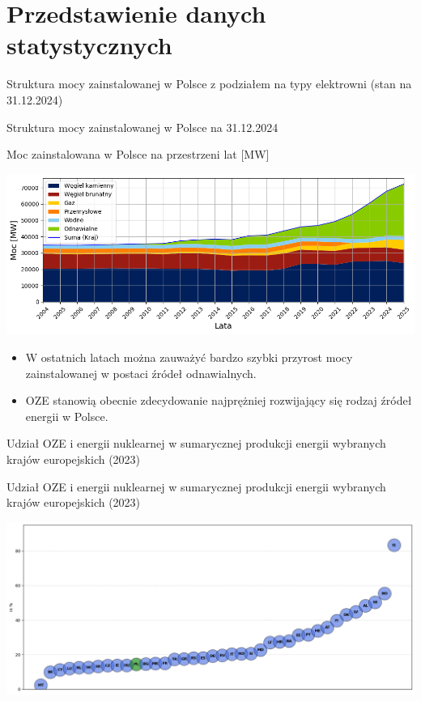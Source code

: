 \section{Przedstawienie danych statystycznych}

\begin{frame}{Struktura mocy zainstalowanej w Polsce z podziałem na typy elektrowni (stan na 31.12.2024)}
\end{frame}

\begin{frame}{Struktura mocy zainstalowanej w Polsce na 31.12.2024}
\end{frame}

\begin{frame}{Moc zainstalowana w Polsce na przestrzeni lat [MW]}
    \begin{center}
    \includegraphics[width=0.8\linewidth]{images/powerOverYears.png}
    \end{center}
    \begin{itemize}
    \item W ostatnich latach można zauważyć bardzo szybki przyrost mocy zainstalowanej w postaci źródeł odnawialnych.
    \item OZE stanowią obecnie zdecydowanie najprężniej rozwijający się rodzaj źródeł energii w Polsce.
    \end{itemize}
\end{frame}

\begin{frame}{Udział OZE i energii nuklearnej w sumarycznej produkcji energii wybranych krajów europejskich (2023)}
\end{frame}

\begin{frame}{Udział OZE i energii nuklearnej w sumarycznej produkcji energii wybranych krajów europejskich (2023)}
    \begin{center}
    \includegraphics[width=\linewidth]{images/ozePercentageShare.png}
    \end{center}
\end{frame}

